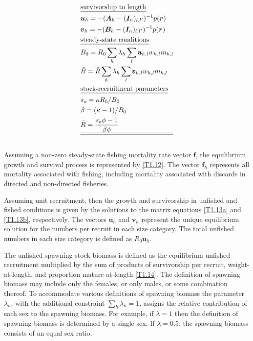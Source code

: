 \documentclass[12pt,letterpaper]{article}
\newcounter{saveEq}
\def\getEq{\setcounter{equation}{\value{saveEq}}}
\def\normalEq{ %
    \getEq
    \renewcommand{\theequation}{\arabic{section}.\arabic{equation}}}
\begin{document}
\begin{table}
\begin{align}
    &\mbox{\underline{survivorship to length}} \nonumber \\
    & \bm{u}_h   = -(\bm{A}_h - (\bm{I}_n)_{l,l'})^{-1} p(\bm{r}) \label{T1.13a}\\
    & \bm{v}_h   = -(\bm{B}_h - (\bm{I}_n)_{l,l'})^{-1} p(\bm{r}) \label{T1.13b}\\
    &\mbox{\underline{steady-state conditions}}\nonumber \\
    & B_0 = R_0 \sum_h \lambda_h \sum_l \pmb{u}_{h,l} w_{h,l} m_{h,l} \label{T1.14}\\
    & \tilde{B} = \tilde{R}\sum_h \lambda_h \sum_l \pmb{v}_{h,l} w_{h,l} m_{h,l} \label{T1.16}\\
    &\mbox{\underline{stock-recruitment parameters}}\nonumber\\
    &s_o = \kappa R_0 / B_0 \label{T1.17}\\
    &\beta = (\kappa -1)/B_0 \label{T1.18}\\
    &\tilde{R} = \frac{s_o \phi -1}{\beta \phi} \label{T1.19}\\
    \hline \hline \nonumber
  \end{align}
\normalEq
\end{table}

    Assuming a non-zero steady-state fishing mortality rate vector $\pmb{f}$, the equilibrium growth and survival process is represented by \eqref{T1.12}.  The vector $\bm{f}_h$ represents all mortality associated with fishing, including mortality associated with discards in directed and non-directed fisheries.

    Assuming unit recruitment, then the growth and survivorship in unfished and fished conditions is given by the solutions to the matrix equations \eqref{T1.13a} and \eqref{T1.13b}, respectively.   The vectors $\bm{u}_h$ and $\bm{v}_h$ represent the unique equilibrium solution for the numbers per recruit in each size category.  The total unfished numbers in each size category is defined as $R_0 \bm{u}_h$.

    The unfished spawning stock biomass is defined as the equilibrium unfished recruitment multiplied by the sum of products of survivorship per recruit, weight-at-length, and proportion mature-at-length \eqref{T1.14}.  The definition of spawning  biomass may include only the females, or only males, or some combination thereof. To accommodate various definitions of spawning biomass the parameter $\lambda_h$, with the additional constraint $\sum_h \lambda_h = 1$, assigns the relative contribution of each sex to the spawning biomass.  For example, if $\lambda = 1$  then the definition of spawning biomass is determined by a single sex. If $\lambda = 0.5$, the spawning biomass consists of an equal sex ratio.
\end{document}
